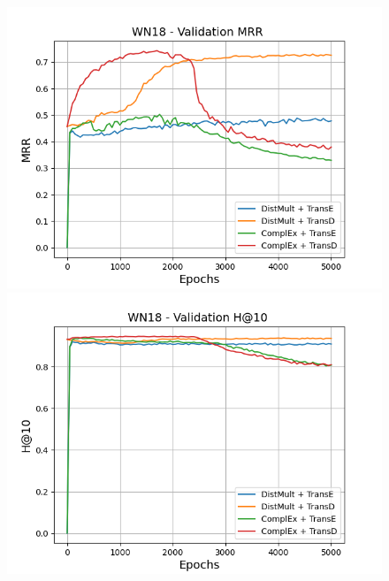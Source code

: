 \begin{figure}
    \centering
    \begin{minipage}{.5\textwidth}
      \centering
      \includegraphics[width=\linewidth]{figures/results/gan_train/pretrained/uncertainty/max/entropy/wn18/5k_epochs/uncertainty_wn18_mrrs.png}
    \end{minipage}%
    \begin{minipage}{.5\textwidth}
      \centering
      \includegraphics[width=\linewidth]{figures/results/gan_train/pretrained/uncertainty/max/entropy/wn18/5k_epochs/uncertainty_wn18_hit10.png}
    \end{minipage}
    

\end{figure}
